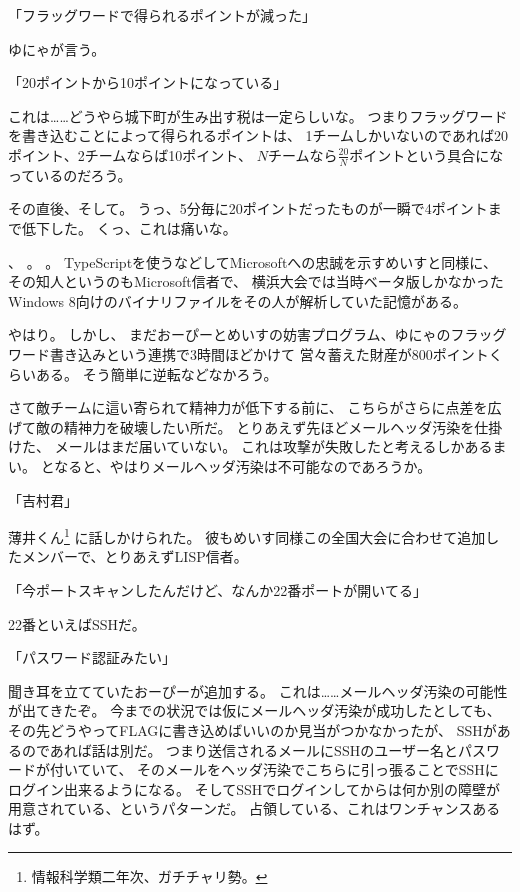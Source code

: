 「フラッグワードで得られるポイントが減った」

ゆにゃが言う。

「20ポイントから10ポイントになっている」

これは……どうやら城下町が生み出す税は一定らしいな。
つまりフラッグワードを書き込むことによって得られるポイントは、
1チームしかいないのであれば20ポイント、2チームならば10ポイント、
$N$チームなら$\frac{20}{N}$ポイントという具合になっているのだろう。

その直後\wasamusume、そして。
うっ、5分毎に20ポイントだったものが一瞬で4ポイントまで低下した。
くっ、これは痛いな。

、
。
。
TypeScriptを使うなどしてMicrosoftへの忠誠を示すめいすと同様に、
その知人というのもMicrosoft信者で、
横浜大会では当時ベータ版しかなかったWindows 8向けのバイナリファイルをその人が解析していた記憶がある。

やはり。
しかし、
まだおーぴーとめいすの妨害プログラム、ゆにゃのフラッグワード書き込みという連携で3時間ほどかけて
営々蓄えた財産が800ポイントくらいある。
そう簡単に逆転などなかろう。

さて敵チームに這い寄られて精神力が低下する前に、
こちらがさらに点差を広げて敵の精神力を破壊したい所だ。
とりあえず先ほどメールヘッダ汚染を仕掛けた、
メールはまだ届いていない。
これは攻撃が失敗したと考えるしかあるまい。
となると、やはりメールヘッダ汚染は不可能なのであろうか。

「吉村君」

薄井くん\footnote{情報科学類二年次、ガチチャリ勢。}%
に話しかけられた。
彼もめいす同様この全国大会に合わせて追加したメンバーで、とりあえずLISP信者。

「今ポートスキャンしたんだけど、なんか22番ポートが開いてる」

22番といえばSSHだ。

「パスワード認証みたい」

聞き耳を立てていたおーぴーが追加する。
これは……メールヘッダ汚染の可能性が出てきたぞ。
今までの状況では仮にメールヘッダ汚染が成功したとしても、
その先どうやってFLAGに書き込めばいいのか見当がつかなかったが、
SSHがあるのであれば話は別だ。
つまり送信されるメールにSSHのユーザー名とパスワードが付いていて、
そのメールをヘッダ汚染でこちらに引っ張ることでSSHにログイン出来るようになる。
そしてSSHでログインしてからは何か別の障壁が用意されている、というパターンだ。
占領している、これはワンチャンスあるはず。

